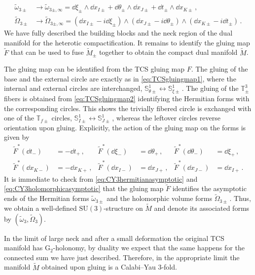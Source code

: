 \documentclass{pspum-l}
\newcommand*\Sc{\mathbb{S}}
\theoremstyle{definition}
\theoremstyle{remark}
\numberwithin{equation}{section}
\begin{document}
\begin{align}
    \label{eq:CY3hermitianasymptotic}
    \widetilde{\omega}_{3\pm} & \longrightarrow \widetilde{\omega}_{3\pm,\infty}=\dd\xi_\pm\wedge\dd x_{I\pm} +\dd\theta_\pm\wedge\dd x_{J\pm}+\dd t_\pm\wedge\dd x_{K\pm} \, ,\\
    \label{eq:CY3holomorphicasymptotic}
    \widetilde{\Omega}_{3\pm} & \longrightarrow \widetilde{\Omega}_{3\pm,\infty}=(\dd x_{I\pm}-i\dd\xi_\pm)\wedge(\dd  x_{J\pm}-i\dd\theta_\pm)\wedge(\dd x_{K\pm}-i\dd t_\pm) \, .
\end{align}
We have fully described the building blocks and the neck region of the dual manifold for the heterotic compactification. It remains to identify the gluing map $\widetilde{F}$ that can be used to fuse $\widetilde{M}_\pm$ together to obtain the compact dual manifold $\widetilde{M}$.

The gluing map can be identified from the TCS gluing map $F$. The gluing of the base and the external circle are exactly as in \eqref{eq:TCSgluingmap1}, where the internal and external circles are interchanged, $\Sc^1_{\theta\pm}\leftrightarrow\Sc^1_{\xi\pm}\,$. The gluing of the $\mathbb{T}^3_\pm$ fibers is obtained from \eqref{eq:TCSgluingmap2} identifying the Hermitian forms with the corresponding circles. This shows the trivially fibered circle is exchanged with one of the $\mathbb{T}_{f\pm}$ circles, $\Sc^1_{I\pm}\leftrightarrow\Sc^1_{J\pm}\,$, whereas the leftover circles reverse orientation upon gluing. Explicitly, the action of the gluing map on the forms is given by
\begin{align}
\label{eq:Schoengluingmap1}
    \widetilde{F}^*(\dd t_-)&=-\dd t_+\, ,& \widetilde{F}^*(\dd\xi_-)&=\dd\theta_+\, ,& \widetilde{F}^*(\dd\theta_-)&=\dd\xi_+\, , \\
    \label{eq:Schoengluingmap2}
    \widetilde{F}^*(\dd x_{K-})&=-\dd x_{K+}\, ,& \widetilde{F}^*(\dd x_{I-})&=\dd x_{J+}\, ,& \widetilde{F}^*(\dd x_{J-})&=\dd x_{I+}\, .
\end{align}
It is immediate to check from \eqref{eq:CY3hermitianasymptotic} and \eqref{eq:CY3holomorphicasymptotic} that the gluing map $\widetilde{F}$ identifies the asymptotic ends of the Hermitian forms $\widetilde{\omega}_{3\pm}$ and the holomorphic volume forms $\widetilde{\Omega}_{3\pm}\,$. Thus, we obtain a well-defined $\text{SU}(3)$-structure on $\widetilde{M}$ and denote its associated forms by $(\widetilde{\omega}_3,\widetilde{\Omega}_3)$.

In the limit of large neck and after a small deformation the original TCS manifold has G$_2$-holonomy, by duality we expect that the same happens for the connected sum we have just described. Therefore, in the appropriate limit the manifold $\widetilde{M}$ obtained upon gluing is a Calabi--Yau 3-fold.
\end{document}
